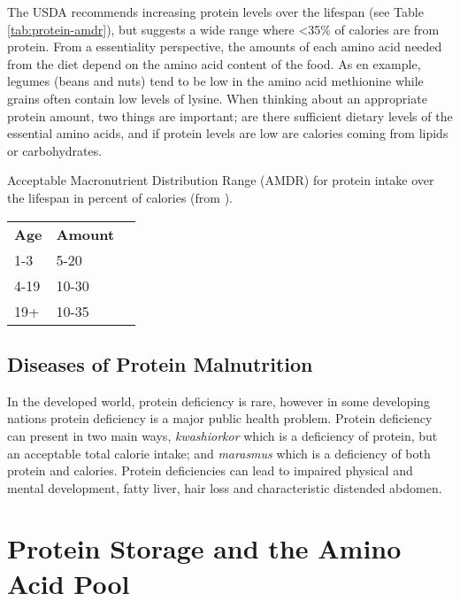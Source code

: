 \documentclass{tufte-handout}
\begin{document}
The USDA recommends increasing protein levels over the lifespan (see Table \ref{tab:protein-amdr}), but suggests a wide range where <35\% of calories are from protein.  From a essentiality perspective, the amounts of each amino acid needed from the diet depend on the amino acid content of the food.  As en example, legumes (beans and nuts) tend to be low in the amino acid methionine while grains often contain low levels of lysine.  When thinking about an appropriate protein amount, two things are important; are there sufficient dietary levels of the essential amino acids, and if protein levels are low are calories coming from lipids or carbohydrates.

\begin{margintable}
\centering
\caption{ Acceptable Macronutrient Distribution Range (AMDR) for protein intake over the lifespan in percent of calories (from \citep{USDA2015}).}
\label{tab:protein-amdr}
\begin{tabular}{lll}
\hline
\textbf {Age} & \textbf{Amount}\\
1-3 & 5-20\\
4-19 & 10-30\\
19+ & 10-35\\
\hline

\hline
\end{tabular}
\end{margintable}

\subsection{Diseases of Protein Malnutrition}

In the developed world, protein deficiency is rare, however in some developing nations protein deficiency is a major public health problem.  Protein deficiency can present in two main ways, \emph{kwashiorkor} which is a deficiency of protein, but an acceptable total calorie intake; and \emph{marasmus} which is a deficiency of both protein and calories.  Protein deficiencies can lead to impaired physical and mental development, fatty liver, hair loss and characteristic distended abdomen.

\section{Protein Storage and the Amino Acid Pool}

\end{document}
